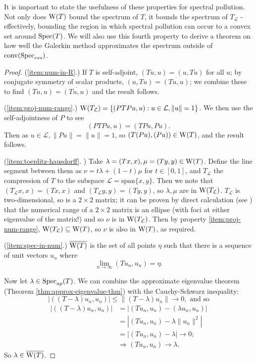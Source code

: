 \documentclass[../main.tex]{subfiles}
\begin{document}
It is important to state the usefulness of these properties for spectral
pollution. Not only does $\mathrm{W}(T)$ bound the spectrum of $T$, it bounds the
spectrum of $T_\mathcal{L}$ - effectively, bounding the region in which spectral
pollution can occur to a convex set around $\mathrm{Spec}(T)$.
We will also use this fourth property to derive a theorem on how well the
Galerkin method approximates the spectrum outside of $\mathrm{conv}(\mathrm{Spec}_{ess})$.

\begin{proof}
(\ref{item:num-in-R}.) If $T$ is self-adjoint, 
$(Tu, u) = (u, Tu)$ for all $u$;
by conjugate symmetry of scalar products, 
$(u, Tu) = \overline{(Tu, u)}$;
we combine these to find 
$(Tu, u) = \overline{(Tu, u)}$
and the result follows. 

(\ref{item:proj-num-range}.) 
$\mathrm{W}(T_\mathcal{L}) = \{( PTPu, u ) : u \in \mathcal{L}, \|u\|=1\}$.
We then use the self-adjointness of $P$ to see
$$( PTPu, u ) = ( TPu, Pu ).$$
Then as $u \in \mathcal{L}, \|Pu\| = \|u\| = 1$,
so $( T(Pu), (Pu) ) \in \mathrm{W}(T)$, and the result follows.

(\ref{item:toeplitz-hausdorff}. 
\cite{gustafson1997numerical})
Take $\lambda = (Tx, x), \mu = (Ty, y) \in \mathrm{W}(T)$. Define the line segment
between them as $\nu = t\lambda + (1-t)\mu$ for $t \in [0, 1]$, and
$T_\mathcal{L}$ the compression of $T$ to the subspace 
$\mathcal{L} = \text{span}\{x, y\}$.
Then we note that $(T_\mathcal{L} x, x) = (Tx, x)$ and $(T_\mathcal{L} y, y) =
(Ty, y)$, so $\lambda, \mu$ are in $\mathrm{W}(T_\mathcal{L})$.
$T_\mathcal{L}$ is two-dimensional, so is a $2 \times 2$ matrix; it can
be proven by direct calculation (see \cite{gustafson1997numerical}) that
the numerical range of a $2 \times 2$ matrix is an ellipse (with foci at
either eigenvalue of the matrix!) and so $\nu$ is in
$\mathrm{W}(T_\mathcal{L})$.
Then by property \ref{item:proj-num-range}, $\mathrm{W}(T_\mathcal{L}) \subseteq
\mathrm{W}(T)$, so $\nu$ is also in $\mathrm{W}(T)$, as required.

(\ref{item:spec-in-num}.) $\overline{\mathrm{W}(T)}$ is the set of all points $\eta$
such that there is a sequence of unit vectors $u_n$ where
$$\lim_{n\rightarrow \infty}( Tu_n, u_n ) = \eta.$$

Now let $\lambda \in \mathrm{Spec}_{ap}(T)$. We can combine the approximate eigenvalue
theorem (Theorem \ref{thm:approx-eigenvalue-thm}) with the
Cauchy-Schwarz inequality: 
$$|( (T - \lambda)u_n, u_n )| \leq \|(T - \lambda)u_n\| \rightarrow 0,\text{ and so}$$
\begin{equation*}
\begin{split}
|( (T - \lambda)u_n, u_n )| &  = |(Tu_n, u_n) - ( \lambda u_n, u_n )| \\
& = |(Tu_n, u_n) - \lambda \|u_n\|^2| \\
& = |(Tu_n, u_n) - \lambda| \rightarrow 0; \\
& \Rightarrow ( Tu_n, u_n ) \rightarrow \lambda.
\end{split}
\end{equation*}
So $\lambda \in \overline{\mathrm{W}(T)}$.
\end{proof}
\end{document}
